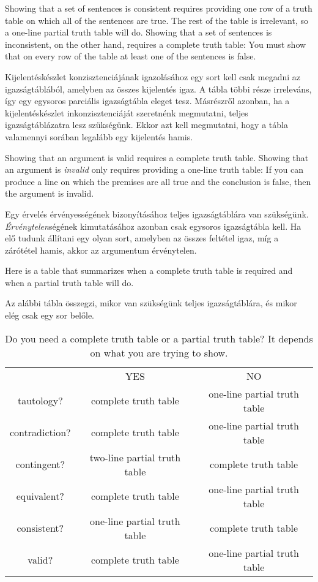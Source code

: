Showing that a set of sentences is consistent requires providing one row of a truth table on which all of the sentences are true. The rest of the table is irrelevant, so a one-line partial truth table will do. Showing that a set of sentences is inconsistent, on the other hand, requires a complete truth table: You must show that on every row of the table at least one of the sentences is false.

Kijelentéskészlet konzisztenciájának igazolásához egy sort kell csak megadni az igazságtáblából, amelyben az összes kijelentés igaz. A tábla többi része irreleváns, így egy egysoros parciális igazságtábla eleget tesz. Másrészről azonban, ha a kijelentéskészlet inkonzisztenciáját szeretnénk megmutatni, teljes igazságtáblázatra lesz szükségünk. Ekkor azt kell megmutatni, hogy a tábla valamennyi sorában legalább egy kijelentés hamis.

Showing that an argument is valid requires a complete truth table. Showing that an argument is \emph{invalid} only requires providing a one-line truth table: If you can produce a line on which the premises are all true and the conclusion is false, then the argument is invalid.

Egy érvelés érvényességének bizonyításához teljes igazságtáblára van szükségünk. \emph{Érvénytelen}ségének kimutatásához azonban csak egysoros igazságtábla kell. Ha elő tudunk állítani egy olyan sort, amelyben az összes feltétel igaz, míg a zárótétel hamis, akkor az argumentum érvénytelen.

Here is a table that summarizes when a complete truth table is required and when a partial truth table will do.

Az alábbi tábla összegzi, mikor van szükségünk teljes igazságtáblára, és mikor elég csak egy sor belőle.

\begin{table}[h!]
\begin{center}
\begin{tabular}{c|c|c|}
\cline{2-3}
 & YES & NO\\
\cline{2-3}
tautology? & complete truth table & one-line partial truth table\\
contradiction? &  complete truth table  & one-line partial truth table\\
contingent? & two-line partial truth table & complete truth table\\
equivalent? & complete truth table & one-line partial truth table\\
consistent? & one-line partial truth table & complete truth table\\
valid? & complete truth table & one-line partial truth table\\
\cline{2-3}
\end{tabular}
\end{center}
\caption{Do you need a complete truth table or a partial truth table? It depends on what you are trying to show.}
\label{table.CompleteVsPartial}
\end{table}

